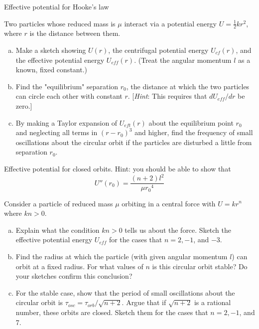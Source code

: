 \documentclass[11pt,letterpaper,boxed]{../hmcpsetrhino}
\newcommand{\half}{\frac{1}{2}}
\begin{document}
\begin{problem}[iii]
Effective potential for Hooke's law

\begin{problem}[8.13]
Two particles whose reduced mass is $\mu$ interact via a potential energy $U = \half k r^2$, where $r$ is the distance between them.
\begin{enumerate}[(a)]
\item Make a sketch showing $U(r)$, the centrifugal potential energy $U_{cf}(r)$, and the effective potential energy $U_{eff}(r)$. (Treat the angular momentum $l$ as a known, fixed constant.)
\item Find the "equilibrium" separation $r_0$, the distance at which the two particles can circle each other with constant $r$. [\textit{Hint}: This requires that $dU_{eff}/dr$ be zero.] 
\item By making a Taylor expansion of $U_{eft}(r)$ about the equilibrium point $r_0$ and neglecting all terms in $(r-r_0)^3$ and higher, find the frequency of small oscillations about the circular orbit if the particles are disturbed a little from separation $r_0$.
\end{enumerate}
\end{problem}
\end{problem}

\begin{solution}

\vfill
\end{solution}

\newpage

\begin{problem}[iv]
Effective potential for closed orbits. Hint: you should be able to show that 
\[	U''(r_0) = \frac{(n+2)l^2}{\mu {r_0}^4}\]

\begin{problem}[8.14]
Consider a particle of reduced mass $\mu$ orbiting in a central force with $U = kr^n$ where $kn > 0$.
\begin{enumerate}[(a)]
\item Explain what the condition $kn > 0$ tells us about the force. Sketch the effective potential energy $U_{eff}$ for the cases that $n =2, -1$, and $-3$.
\item Find the radius at which the particle (with given angular momentum $l$) can orbit at a fixed radius. For what values of $n$ is this circular orbit stable? Do your sketches confirm this conclusion?
\item For the stable case, show that the period of small oscillations about the circular orbit is $\tau_{osc} = \tau_{orb}/\sqrt{n+2}$. Argue that if $\sqrt{n+2}$ is a rational number, these orbits are closed. Sketch them for the cases that $n = 2, -1$, and 7.
\end{enumerate}
\end{problem}
\end{problem}

\begin{solution}

\vfill
\end{solution}
\end{document}
